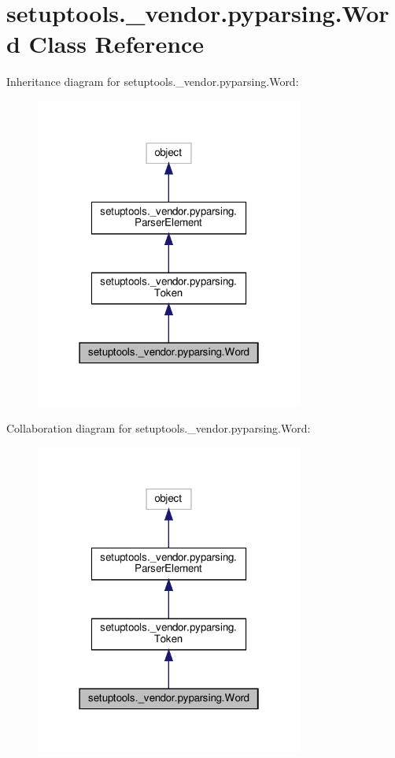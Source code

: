 \hypertarget{classsetuptools_1_1__vendor_1_1pyparsing_1_1Word}{}\section{setuptools.\+\_\+vendor.\+pyparsing.\+Word Class Reference}
\label{classsetuptools_1_1__vendor_1_1pyparsing_1_1Word}


Inheritance diagram for setuptools.\+\_\+vendor.\+pyparsing.\+Word\+:
\nopagebreak
\begin{figure}[H]
\begin{center}
\leavevmode
\includegraphics[width=250pt]{classsetuptools_1_1__vendor_1_1pyparsing_1_1Word__inherit__graph}
\end{center}
\end{figure}


Collaboration diagram for setuptools.\+\_\+vendor.\+pyparsing.\+Word\+:
\nopagebreak
\begin{figure}[H]
\begin{center}
\leavevmode
\includegraphics[width=250pt]{classsetuptools_1_1__vendor_1_1pyparsing_1_1Word__coll__graph}
\end{center}
\end{figure}
